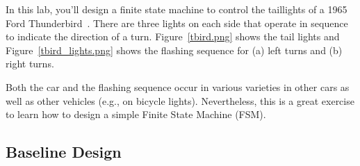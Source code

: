 \documentclass{article}
\begin{document}
In this lab, you’ll design a finite state machine to control the
taillights of a 1965 Ford
Thunderbird~\cite{DBLP:books/daglib/0067158}. There are three lights
on each side that operate in sequence to indicate the
direction of a turn. Figure~\ref{tbird.png} shows the tail lights and
Figure~\ref{tbird_lights.png} shows
the flashing sequence for (a) left turns and (b) right turns.

Both the car and the flashing sequence occur in various varieties in
other cars as well as other vehicles
(e.g., on bicycle lights).  Nevertheless, this is a great 
exercise to learn how to design a simple Finite State Machine (FSM).

\subsection{Baseline Design}
\end{document}
